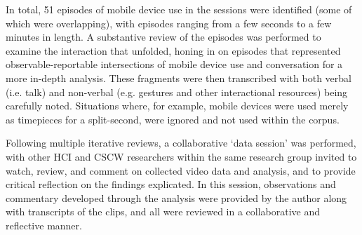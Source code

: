 In total, 51 episodes of mobile device use in the sessions were identified (some of which were overlapping), with episodes ranging from a few seconds to a few minutes in length.
A substantive review of the episodes was performed to examine the interaction that unfolded, honing in on episodes that represented observable-reportable intersections of mobile device use and conversation for a more in-depth analysis.
These fragments were then transcribed with both verbal (i.e. talk) and non-verbal (e.g. gestures and other interactional resources) being carefully noted.
Situations where, for example, mobile devices were used merely as timepieces for a split-second, were ignored and not used within the corpus.

Following multiple iterative reviews, a collaborative `data session' was performed, with other \ac{HCI} and \ac{CSCW} researchers within the same research group invited to watch, review, and comment on collected video data and analysis, and to provide critical reflection on the findings explicated.
In this session, observations and commentary developed through the analysis were provided by the author along with transcripts of the clips, and all were reviewed in a collaborative and reflective manner.







